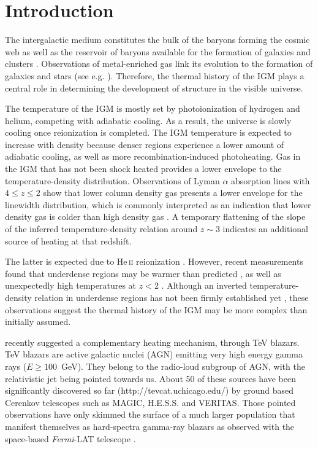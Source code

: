 \documentclass[numberedappendix]{emulateapj}
\begin{document}
\section{Introduction}
The intergalactic medium constitutes the bulk of the baryons forming the cosmic web \citep{1996Natur.380..603B} as well as the reservoir of baryons available for the formation of galaxies and clusters \citep{1997ApJ...489....7R}. Observations of metal-enriched gas link its evolution to the formation of galaxies and stars (see e.g. \citet{2009A&A...493..409S,2010MNRAS.407.2063W}). Therefore, the thermal history of the IGM plays a central role in determining the development of structure in the visible universe.

The temperature of the IGM is mostly set by photoionization of hydrogen and helium, competing with adiabatic cooling. As a result, the universe is slowly cooling once reionization is completed. The IGM temperature is expected to increase with density because denser regions experience a lower amount of adiabatic cooling, as well as more recombination-induced photoheating. Gas in the IGM that has not been shock heated provides a lower envelope to the temperature-density distribution.  Observations of Lyman $\alpha$ absorption lines with $4\leqslant z \leqslant 2$ show that lower column density gas presents a lower envelope for the linewidth distribution, which is commonly interpreted as an indication that lower density gas is colder than high density gas \citep{2000MNRAS.318..817S,2000ApJ...534...41R,2012ApJ...757L..30R}. A temporary flattening of the slope of the inferred temperature-density relation around $z\sim 3$ indicates an additional source of heating at that redshift.

The latter is expected due to He\,\textsc{ii} reionization \citep[e.g.][]{2009ApJ...694..842M,2013MNRAS.435.3169C,2014arXiv1410.1531P}. However, recent measurements found that underdense regions may be warmer than predicted \citep{2009MNRAS.399L..39V,2008MNRAS.386.1131B}, as well as unexpectedly high temperatures at $z<2$ \citep{2014MNRAS.441.1916B}. Although an inverted temperature-density relation in underdense regions has not been firmly established yet \citep{2014MNRAS.438.2499B}, these observations suggest the thermal history of the IGM may be more complex than initially assumed.

\citet{2012ApJ...752...22B} recently suggested a complementary heating mechanism, through TeV blazars. TeV blazars are active galactic nuclei (AGN) emitting very high energy gamma rays ($E\ge100$~GeV). They belong to the radio-loud subgroup of AGN, with the relativistic jet being pointed towards us. About 50 of these sources have been significantly discovered so far (http://tevcat.uchicago.edu/) by ground based Cerenkov telescopes such as MAGIC, H.E.S.S. and VERITAS. Those pointed observations have only skimmed the surface of a much larger population that manifest themselves as hard-spectra gamma-ray blazars as observed with the space-based \textit{Fermi}-LAT telescope \citep{2014ApJ...790..137B}. 
\end{document}
